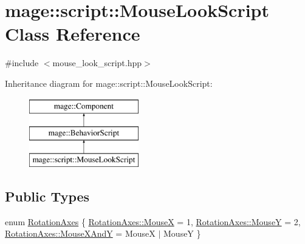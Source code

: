 \hypertarget{classmage_1_1script_1_1_mouse_look_script}{}\section{mage\+:\+:script\+:\+:Mouse\+Look\+Script Class Reference}
\label{classmage_1_1script_1_1_mouse_look_script}


{\ttfamily \#include $<$mouse\+\_\+look\+\_\+script.\+hpp$>$}

Inheritance diagram for mage\+:\+:script\+:\+:Mouse\+Look\+Script\+:\begin{figure}[H]
\begin{center}
\leavevmode
\includegraphics[height=3.000000cm]{classmage_1_1script_1_1_mouse_look_script}
\end{center}
\end{figure}
\subsection*{Public Types}
\begin{DoxyCompactItemize}
\item 
enum \hyperlink{classmage_1_1script_1_1_mouse_look_script_aa8c8ce1a3e6ccefa7b8ddd31be209c23}{Rotation\+Axes} \{ \hyperlink{classmage_1_1script_1_1_mouse_look_script_aa8c8ce1a3e6ccefa7b8ddd31be209c23abf27c48f8a38ed19eeeba089dd8d3ba1}{Rotation\+Axes\+::\+MouseX} = 1, 
\hyperlink{classmage_1_1script_1_1_mouse_look_script_aa8c8ce1a3e6ccefa7b8ddd31be209c23a73843207a289db41b16a5bb8254ca425}{Rotation\+Axes\+::\+MouseY} = 2, 
\hyperlink{classmage_1_1script_1_1_mouse_look_script_aa8c8ce1a3e6ccefa7b8ddd31be209c23a109431b32c091e8a7ad541546c66c522}{Rotation\+Axes\+::\+Mouse\+X\+AndY} = MouseX $\vert$ MouseY
 \}
\end{DoxyCompactItemize}
